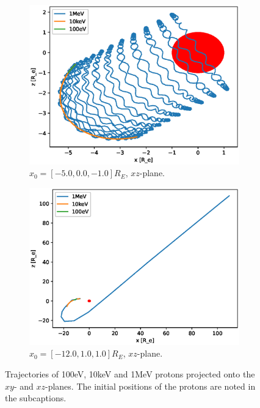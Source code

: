 \begin{figure}
\begin{subfigure}[h]{0.45\textwidth}
        \includegraphics[width=\textwidth]{Figures/Trajectories/trajectories-xz-36.eps}
        \caption{$x_0 = [-5.0,0.0,-1.0]R_E$, $xz$-plane.}
        \label{fig:traj-g}
    \end{subfigure}
    \hfill
    \begin{subfigure}[h]{0.45\textwidth}
        \includegraphics[width=\textwidth]{Figures/Trajectories/trajectories-xz-98.eps}
        \caption{$x_0 = [-12.0,1.0,1.0]R_E$, $xz$-plane.}
        \label{fig:traj-h}
    \end{subfigure}
    \caption{Trajectories of 100eV, 10keV and 1MeV protons projected onto the $xy$- and 
    $xz$-planes. The initial positions of the protons are noted in the subcaptions.}
    \label{fig:trajectories}
\end{figure}